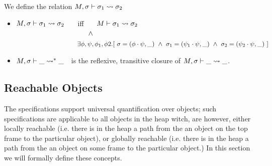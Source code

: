 {
\begin{definition}
\label{def:shallow:term}
We define the relation  $M, \sigma \vdash {\sigma_1} \leadsto \sigma_2$ 

\begin{itemize}
\item
 $M, \sigma \vdash {\sigma_1} \leadsto \sigma_2$ \ \ \ iff \ \ \  $M \vdash \sigma_1 \leadsto {\sigma_2}$\\
$\strut  \hspace{3.6cm} \wedge $\\
$\strut  \hspace{3.1cm}\ \    \exists \phi,\psi, \phi_1, \phi2.[ \ \sigma = (\phi\cdot\psi,\_) \ \wedge \ \sigma_1 = (\psi_1\cdot \psi, \_)
\ \wedge\ \sigma_2 = (\psi_2\cdot \psi, \_)\ ] $ 
\item
 $M, \sigma \vdash {\_} \leadsto^* \_$\ \  is the reflexive, transitive closure of $M, \sigma \vdash {\_} \leadsto \_$.
\end{itemize}
\end{definition}
}
 

  \subsection{{Reachable  Objects}}
  
{The  \SpecLang  specifications support universal quantification over  objects; such specifications 
are applicable  to all objects in the heap witch, are however, either locally reachable (i.e. there is in the heap a path from the an 
object on the top frame to the particular object), or globally reachable (i.e. there is in the heap a path from the an 
object on some frame to the particular object.)
In this section  we will formally define these concepts.}
 



